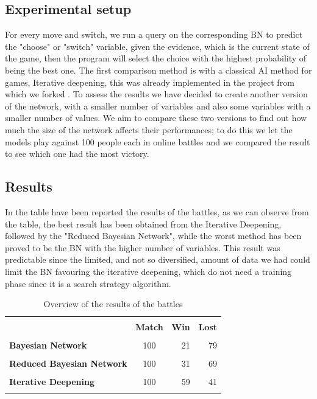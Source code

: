 \documentclass[letterpaper]{article}
\begin{document}
\subsection{Experimental setup}
For every move and switch, we run a query on the corresponding BN to predict the "choose" or "switch" variable, given the evidence, which is the current state of the game, then the program will select the choice with the highest probability of being the best one.
The first comparison method is with a classical AI method for games, Iterative deepening, this was already implemented in the project from which we forked \cite{bot}.
To assess the results we have decided to create another version of the network, with a smaller number of variables and also some variables with a smaller number of values. We aim to compare these two versions to find out how much the size of the network affects their performances; to do this we let the models play against 100 people each in online battles and we compared the result to see which one had the most victory.

\subsection{Results}
In the table have been reported the results of the battles, as we can observe from the table, the best result has been obtained from the Iterative Deepening, followed by the "Reduced Bayesian Network", while the worst method has been proved to be the BN with the higher number of variables. This result was predictable since the limited, and not so diversified, amount of data we had could limit the BN favouring the iterative deepening, which do not need a training phase since it is a search strategy algorithm.
\begin{table}[h]
    \small
    \centering
    \begin{tabular}{lcrr}
        \hline \\[-1.8ex] 
        \hline \\[-1.8ex] 
        \textbf{} & \textbf{Match}  & \textbf{Win} & \textbf{Lost}\\
        \hline \\[-1.8ex] 
        \textbf{Bayesian Network}           &100   &21  &79\\
        \hline \\[-1.8ex] 
        \textbf{Reduced Bayesian Network}   &100  &31  &69\\
        \hline \\[-1.8ex] 
        \textbf{Iterative Deepening}        &100  &59  &41\\
        \hline \\[-1.8ex] 
        
    \end{tabular}
    \caption{Overview of the results of the battles} 
    \label{tab:libraries}
\end{table}
\end{document}

